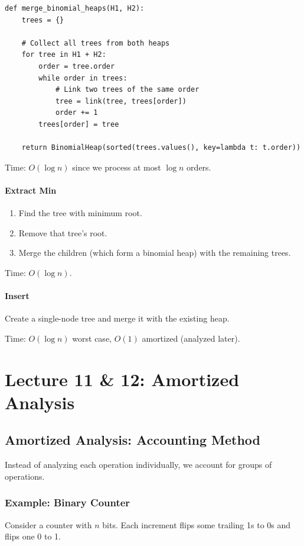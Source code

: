 \documentclass[11pt]{article}
\begin{document}
{{{\begin{lstlisting}
def merge_binomial_heaps(H1, H2):
    trees = {}
    
    # Collect all trees from both heaps
    for tree in H1 + H2:
        order = tree.order
        while order in trees:
            # Link two trees of the same order
            tree = link(tree, trees[order])
            order += 1
        trees[order] = tree
    
    return BinomialHeap(sorted(trees.values(), key=lambda t: t.order))
\end{lstlisting}

Time: $O(\log n)$ since we process at most $\log n$ orders.

\paragraph{Extract Min}
\begin{enumerate}
\item Find the tree with minimum root.
\item Remove that tree's root.
\item Merge the children (which form a binomial heap) with the remaining trees.
\end{enumerate}

Time: $O(\log n)$.

\paragraph{Insert}
Create a single-node tree and merge it with the existing heap.

Time: $O(\log n)$ worst case, $O(1)$ amortized (analyzed later).

\section{Lecture 11 & 12: Amortized Analysis}

\subsection*{Amortized Analysis: Accounting Method}

Instead of analyzing each operation individually, we account for groups of operations.

\subsubsection*{Example: Binary Counter}
Consider a counter with $n$ bits. Each increment flips some trailing 1s to 0s and flips one 0 to 1.

}}}
\end{document}
